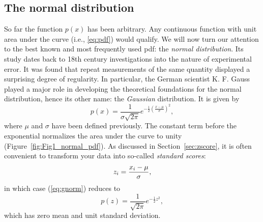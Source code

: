 \subsection{The normal distribution}

	So far the function $p(x)$ has been arbitrary. Any continuous function with unit area under 
the curve (i.e., \ref{eq:pdf}) would qualify.  We will now turn our attention to the best known and most frequently 
used pdf: the \emph{normal distribution}.  Its study dates back to  18th 
century investigations into the nature of experimental error.  It was found that repeat 
measurements of the same quantity displayed a surprising degree of regularity.  In particular, the German scientist K. 
F. Gauss played a major role in developing the theoretical foundations for the normal distribution,
hence its other name: the \emph{Gaussian} distribution.  It is given by
\begin{equation}
p(x) = \frac{1}{\sigma \sqrt{2 \pi}} e^{- \frac{1}{2} \left( \frac{x-\mu}{\sigma} \right) ^2 },
\label{eq:gnorm}
\end{equation}
where $\mu$ and $\sigma$ have been defined previously.  The constant term before the exponential normalizes the 
area under the curve to unity (Figure~\ref{fig:Fig1_normal_pdf}).  As discussed in Section~\ref{sec:zscore},
it is often convenient to transform your data into so-called 
\emph{standard scores}:
\begin{equation}
	\index{Standard scores}
	\index{Normal scores}
z_i = \frac{x_i - \mu} {\sigma},
\end{equation}
in which case (\ref{eq:gnorm}) reduces to 
\begin{equation}
p(z) = \frac{1}{ \sqrt{2\pi}} e^{-\frac{1}{2}z^2},
\end{equation}
which has zero mean and unit standard deviation.


